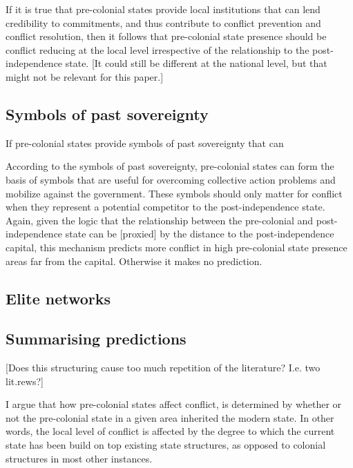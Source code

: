 \documentclass[12pt]{article}
\begin{document}
If it is true that pre-colonial states provide local institutions that can lend
credibility to commitments, and thus contribute to conflict prevention and
conflict resolution, then it follows that pre-colonial state presence should be
conflict reducing at the local level irrespective of the relationship to the
post-independence state. [It could still be different at the national level, but
that might not be relevant for this paper.]

\subsection{Symbols of past sovereignty} \label{Symbols of sovereignty}

If pre-colonial states provide symbols of past sovereignty that can 

According to the symbols of past sovereignty, pre-colonial states can form the
basis of symbols that are useful for overcoming collective action problems and
mobilize against the government. These symbols should only matter for conflict
when they represent a potential competitor to the post-independence state.
Again, given the logic that the relationship between the pre-colonial and
post-independence state can be [proxied] by the distance to the
post-independence capital, this mechanism predicts more conflict in high
pre-colonial state presence areas far from the capital. Otherwise it makes no
prediction. 

\subsection{Elite networks} \label{Elite networks}

\subsection{Summarising predictions} \label{Summarising predictions}


[Does this structuring cause too much repetition of the literature? I.e. two
lit.rews?] 

I argue that how pre-colonial states affect conflict, is determined by whether
or not the pre-colonial state in a given area inherited the modern state. In
other words, the local level of conflict is affected by the degree to which the
current state has been build on top existing state structures, as opposed to
colonial structures in most other instances. 
\end{document}
